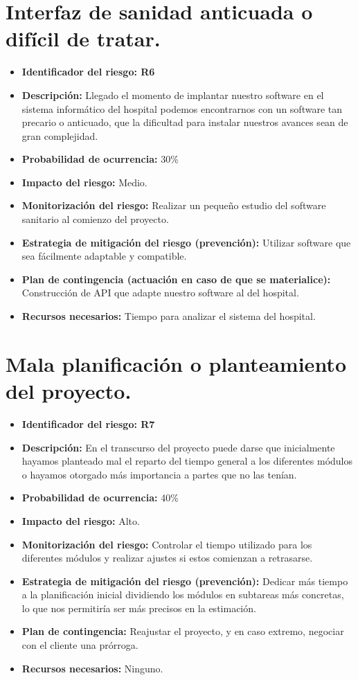 \section{Interfaz de sanidad anticuada o difícil de tratar.}

\begin{itemize}
	\item \textbf{Identificador del riesgo: R6}
	\item \textbf{Descripción: } Llegado el momento de implantar nuestro software en el sistema informático del hospital podemos encontrarnos con un software tan precario o anticuado, que la dificultad para instalar nuestros avances sean de gran complejidad.
	\item \textbf{Probabilidad de ocurrencia: } 30\%
	\item \textbf{Impacto del riesgo: } Medio.
	\item \textbf{Monitorización del riesgo: } Realizar un pequeño estudio del software sanitario al comienzo del proyecto. 
	\item \textbf{Estrategia de mitigación del riesgo (prevención): } Utilizar software que sea fácilmente adaptable y compatible. 
	\item \textbf{Plan de contingencia (actuación en caso de que se materialice): } Construcción de API que adapte nuestro software al del hospital.
	\item \textbf{Recursos necesarios: } Tiempo para analizar el sistema del hospital.
\end{itemize}

\section{Mala planificación o planteamiento del proyecto.}
\begin{itemize}
	\item \textbf{Identificador del riesgo: R7}
	\item \textbf{Descripción: } En el transcurso del proyecto puede darse que inicialmente hayamos planteado mal el reparto del tiempo general a los diferentes módulos o hayamos otorgado más importancia a partes que no las tenían.
	\item \textbf{Probabilidad de ocurrencia: } 40\%
	\item \textbf{Impacto del riesgo: } Alto.
	\item \textbf{Monitorización del riesgo: } Controlar el tiempo utilizado para los diferentes módulos y realizar ajustes si estos comienzan a retrasarse.
	\item \textbf{Estrategia de mitigación del riesgo (prevención): } Dedicar más tiempo a la planificación inicial dividiendo los módulos en subtareas más concretas, lo que nos permitiría ser más precisos en la estimación.
	\item \textbf{Plan de contingencia: } Reajustar el proyecto, y en caso extremo, negociar con el cliente una prórroga.
	\item \textbf{Recursos necesarios: } Ninguno.
\end{itemize}


